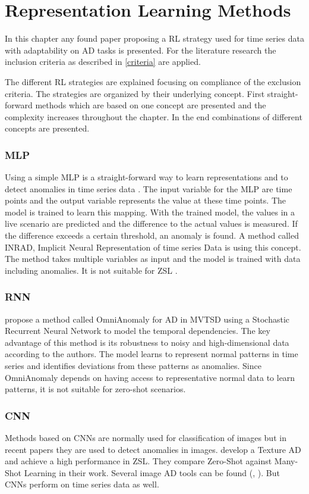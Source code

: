 \section{Representation Learning Methods}\label{review}
In this chapter any found paper proposing a RL strategy used for time series data with adaptability on AD tasks is presented. For the literature research the inclusion criteria as described in \autoref{criteria} are applied.

The different RL strategies are explained focusing on compliance of the exclusion criteria. The strategies are organized by their underlying concept. First straight-forward methods which are based on one concept are presented and the complexity increases throughout the chapter. In the end combinations of different concepts are presented.
\subsubsection{MLP}
Using a simple MLP is a straight-forward way to learn representations and to detect anomalies in time series data \cite{nielsen_neural_2015}. The input variable for the MLP are time points and the output variable represents the value at these time points. The model is trained to learn this mapping. With the trained model, the values in a live scenario are predicted and the difference to the actual values is measured. If the difference exceeds a certain threshold, an anomaly is found. A method called INRAD, Implicit Neural Representation of time series Data is using this concept. The method takes multiple variables as input and the model is trained with data including anomalies. It is not suitable for ZSL \cite{jeong_time series_2022}.
\subsubsection{RNN}
\cite{su_robust_2019} propose a method called OmniAnomaly for AD in MVTSD using a Stochastic Recurrent Neural Network to model the temporal dependencies.
The key advantage of this method is its robustness to noisy and high-dimensional data according to the authors. The model learns to represent normal patterns in time series and identifies deviations from these patterns as anomalies. Since OmniAnomaly depends on having access to representative normal data to learn patterns, it is not suitable for zero-shot scenarios.
\subsubsection{CNN}
Methods based on CNNs are normally used for classification of images but in recent papers they are used to detect anomalies in images. \cite{aota_zero-shot_2023} develop a Texture AD and achieve a high performance in ZSL. They compare Zero-Shot against Many-Shot Learning in their work. Several image AD tools can be found (\cite{sabokrou_deep-anomaly__2018}, \cite{aota_zero-shot_2023}). But CNNs perform on time series data as well.

